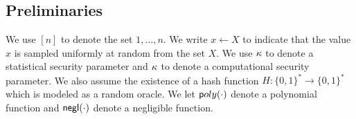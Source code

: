 \subsection{Preliminaries} \label{sec:prelim}
We use $[n]$ to denote the set $1, \ldots, n$.  We write $x \gets X$ to indicate that the value $x$ is sampled uniformly at random from the set $X$.  We use $\kappa$ to denote a statistical security parameter and $\kappa$ to denote a computational security parameter.  We also assume the existence of a hash function $H:\{0,1\}^* \rightarrow \{0,1\}^*$ which is modeled as a random oracle.  We let ${\mathsf poly}(\cdot)$ denote a polynomial function and $\mathsf{negl}(\cdot)$ denote a negligible function. 